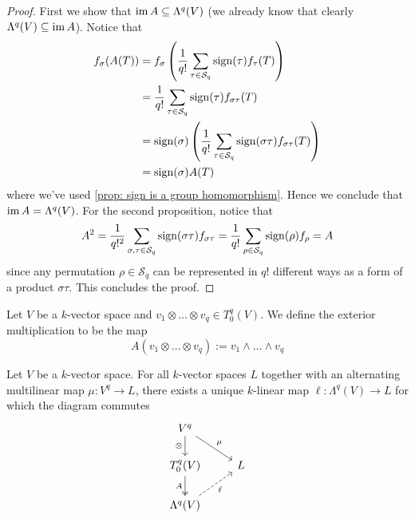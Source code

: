 \begin{proof}
  First we show that \(\operatorname{im} A \subseteq \Lambda^q(V)\) (we already know that
  clearly \(\Lambda^q(V) \subseteq \operatorname{im} A\)). Notice that
  \begin{align*}
    f_\sigma(A(T))
    &= f_\sigma \left( \frac 1 {q!} \sum_{\tau \in \mathcal S_q}
    \operatorname{sign}(\tau) f_\tau(T) \right) \\
    &= \frac 1 {q!} \sum_{\tau \in \mathcal S_q} \operatorname{sign}(\tau)
    f_{\sigma \tau}(T) \\
    &= \operatorname{sign}(\sigma) \left( \frac 1 {q!} \sum_{\tau \in \mathcal
    S_q} \operatorname{sign}(\sigma \tau) f_{\sigma \tau}(T) \right) \\
    &= \operatorname{sign}(\sigma) A(T)
  \end{align*}
  where we've used \cref{prop: sign is a group homomorphism}. Hence we conclude
  that \(\operatorname{im} A = \Lambda^q(V)\). For the second proposition, notice that
  \[
    A^2 = \frac 1 {q!^2} \sum_{\sigma, \tau \in \mathcal S_q}
    \operatorname{sign}(\sigma \tau) f_{\sigma \tau}
    = \frac 1 {q!} \sum_{\rho \in \mathcal S_q} \operatorname{sign}(\rho)
    f_\rho = A
  \]
  since any permutation \(\rho \in \mathcal S_q\) can be represented in \(q!\)
  different ways as a form of a product \(\sigma \tau\). This concludes the
  proof.
\end{proof}

\begin{definition}
  \label{def: exterior multiplication}
  Let \(V\) be a \(k\)-vector space and \(v_1 \otimes \dots \otimes v_q \in
  T_0^q(V)\). We define the exterior multiplication to be the map
  \[
    A(v_1 \otimes \dots \otimes v_q) := v_1 \wedge \dots \wedge v_q
  \]
\end{definition}

\begin{proposition}
  \label{prop: exterior power universal property}
  Let \(V\) be a \(k\)-vector space. For all \(k\)-vector spaces \(L\) together
  with an alternating multilinear map \(\mu: V^q \to L\), there exists a unique
  \(k\)-linear map \(\ell: \Lambda^q(V) \to L\) for which the diagram commutes
  \[
    \begin{tikzcd}
      V^q \ar[d, swap, "\otimes"] \ar[dr, "\mu"] \\
      T_0^q(V) \ar[d, swap, two heads, "A"] &L \\
      \Lambda^q(V) \ar[ur, dashed, swap, "\ell"]
    \end{tikzcd}
  \]
\end{proposition}

